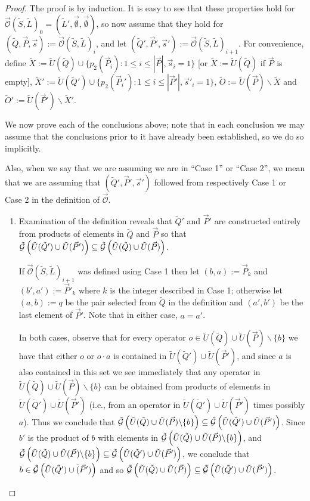 \documentclass[twocolumn,showpacs,preprintnumbers,amsmath,amssymb,nofootinbib,pra,floatfix]{revtex4-1}
\newcommand{\lst}{\vec}
\newcommand{\set}{\tilde}
\newcommand{\genfun}{\tilde{\mathcal{G}}}
\newcommand{\unpack}{\set U}
\newcommand{\optimizer}{\lst{\mathcal{O}}}
\begin{document}
\begin{proof}
The proof is by induction.  It is easy to see that these properties hold for $\optimizer(\set S,\set L)_0=(\set L',\lst\emptyset,\lst\emptyset)$, so now assume that they hold for $(\set Q,\lst P,\lst s):=\optimizer(\set S,\set L)_i$, and let $(\set Q',\lst P',\lst s'):=\optimizer(\set S,\set L)_{i+1}$.  For convenience, define $\set X:=\unpack(\set Q)\cup\{p_2(\lst P_i):1 \le i \le |\lst P|, \lst s_i=1\}$ [or $\set X:=\unpack(\set Q)$ if $\lst P$ is empty], $\set X':=\unpack(\set Q')\cup\{p_2(\lst P_i'):1 \le i \le |\lst P'|, \lst s'_i=1\}$, $\set O:=\unpack(\lst P)\backslash\set X$ and $\set O':=\unpack(\lst P')\backslash\set X'$.

We now prove each of the conclusions above;  note that in each conclusion we may assume that the conclusions prior to it have already been established, so we do so implicitly.

Also, when we say that we are assuming we are in ``Case 1'' or ``Case 2'', we mean that we are assuming that $(\set Q',\lst P',\lst s')$ followed from respectively Case 1 or Case 2 in the definition of $\optimizer$.

\begin{enumerate}
\item

Examination of the definition reveals that $\set Q'$ and $\lst P'$ are constructed entirely from products of elements in $\set Q$ and $\lst P$ so that $\genfun\paren{\set U(\set Q')\cup\set U(\lst P')}\subseteq\genfun\paren{\set U(\set Q)\cup\set U(\lst P)}$.

If $\optimizer(\set S,\set L)_{i+1}$ was defined using Case 1 then let $(b,a):=\lst P_k$ and $(b',a'):=\lst P'_k$ where $k$ is the integer described in Case 1;  otherwise let $(a,b):=q$ be the pair selected from $\set Q$ in the definition and $(a',b')$ be the last element of $\lst P'$.  Note that in either case, $a=a'$.

In both cases, observe that for every operator $o\in\set U(\set Q)\cup\set U(\lst P)\backslash\{b\}$ we have that either $o$ or $o\cdot a$ is contained in $\set U(\set Q')\cup\set U(\lst P')$, and since $a$ is also contained in this set we see immediately that any operator in $\set U(\set Q)\cup\set U(\lst P)\backslash\{b\}$ can be obtained from products of elements in $\set U(\set Q')\cup\set U(\lst P')$ (i.e., from an operator in $\set U(\set Q')\cup\set U(\lst P')$ times possibly $a$).  Thus we conclude that $\genfun\paren{\set U(\set Q)\cup\set U(\lst P)\backslash\{b\}}\subseteq\genfun\paren{\set U(\set Q')\cup\set U(\lst P')}$.  Since $b'$ is the product of $b$ with elements in $\genfun\paren{\set U(\set Q)\cup\set U(\lst P)\backslash\{b\}}$, and $\genfun\paren{\set U(\set Q)\cup\set U(\lst P)\backslash\{b\}}\subseteq\genfun\paren{\set U(\set Q')\cup\set U(\lst P')}$, we conclude that $b\in\genfun\paren{\set U(\set Q')\cup\set(\lst P')}$ and so $\genfun\paren{\set U(\set Q)\cup\set U(\lst P)}\subseteq\genfun\paren{\set U(\set Q')\cup\set U(\lst P')}$.


\end{enumerate}
\end{proof}
\end{document}
